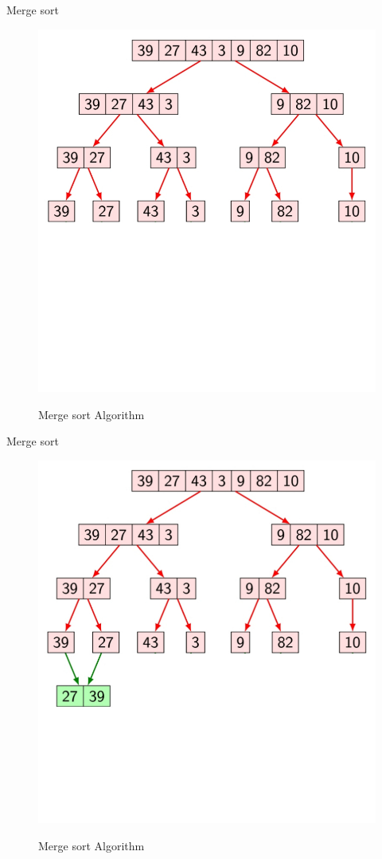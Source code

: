 \documentclass{beamer}
\begin{document}
\begin{frame}{Merge sort}
	\begin{figure}[h]
		\centering
		\includegraphics[scale=0.24]{IKEHS8.jpg}
		\label{fig:2}
		\caption{Merge sort Algorithm}
	\end{figure}
\end{frame}

\begin{frame}{Merge sort}
	\begin{figure}[h]
		\centering
		\includegraphics[scale=0.24]{IKEHS9.jpg}
		\label{fig:2}
		\caption{Merge sort Algorithm}
	\end{figure}
\end{frame}
\end{document}
